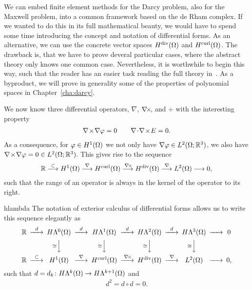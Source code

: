 \begin{intro}
  We can embed finite element methods for the Darcy problem, also for
  the Maxwell problem, into a common framework based on the de Rham
  complex. If we wanted to do this in its full mathematical beauty, we
  would have to spend some time introducing the concept and notation
  of differential forms. As an alternative, we can use the concrete
  vector spaces $H^{\text{div}}(\Omega)$ and $H^{\text{curl}}(\Omega)$. The drawback
  is, that we have to prove deveral particular cases, where the
  abstract theory only knows one common case. Nevertheless, it is
  worthwhile to begin this way, such that the reader has an easier
  task reading the full theory
  in~\cite{ArnoldFalkWinther06acta,ArnoldFalkWinther10}. As a byproduct,
  we will prove in generality some of the properties of polynomial
  spaces in Chapter~\ref{cha:darcy}.
\end{intro}

\begin{intro}
  We now know three differential operators, $\nabla$, $\nabla\!\times\!$, and
  $\div$ with the interesting property
  \begin{gather}
    \nabla\!\times\!\nabla \varphi = 0
    \qquad \nabla\!\cdot\!\nabla\!\times\! E=0.
  \end{gather}
  As a consequence, for $\varphi\in H^1(\Omega)$ we not only have
  $\nabla \varphi\in L^2(\Omega;\mathbb R^3)$, we also have
  $\nabla\!\times\!\nabla\varphi=0\in L^2(\Omega;\mathbb R^3)$. This gives rise to the sequence
  \begin{gather}
    \mathbb R
    \overset{\subset}{\longrightarrow} H^1(\Omega)
    \overset{\nabla}{\longrightarrow} H^{\text{curl}}(\Omega)
    \overset{\nabla\!\times\!}{\longrightarrow} H^{\text{div}}(\Omega)
    \overset{\nabla\!\cdot\!}{\longrightarrow} L^2(\Omega)
    \longrightarrow 0,
  \end{gather}
  such that the range of an operator is always in the kernel of the
  operator to its right.
\end{intro}

\begin{Notation}{hlambda}
  The notation of exterior calculus of differential forms allows us to
  write this sequence elegantly as
  \begin{gather}\minCDarrowwidth20pt
    \begin{CD}
      \R
      @>{d}>> H\Lambda^0(\domain)
      @>{d}>> H\Lambda^1(\domain)
      @>{d}>> H\Lambda^2(\domain)
      @>{d}>> H\Lambda^3(\domain)
      @>>> 0
      \\
      @.
      @V{\cong}VV
      @V{\cong}VV
      @V{\cong}VV
      @V{\cong}VV
      \\
      \R
      @>{\subset}>> H^1(\domain)
      @>{\nabla}>> \Hcurl(\domain)
      @>{\curl}>> \Hdiv(\domain)
      @>{\div}>> L^2(\domain)
      @>>> 0,
    \end{CD}
  \end{gather}
  such that $d=d_k\colon H\Lambda^k(\Omega) \to H\Lambda^{k+1}(\Omega)$ and
  \begin{gather}
    d^2 = d\circ d = 0.
  \end{gather}
\end{Notation}


